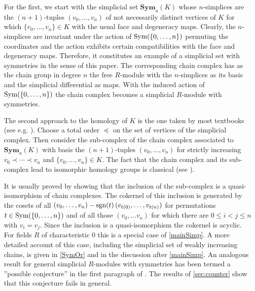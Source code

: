 \documentclass[12pt]{amsart}
\theoremstyle{plain}
\numberwithin{lemma}{\DefaultNumberTheoremWithin}
\numberwithin{claim}{\DefaultNumberTheoremWithin}
\numberwithin{theorem}{\DefaultNumberTheoremWithin}
\numberwithin{corollary}{\DefaultNumberTheoremWithin}
\numberwithin{proposition}{\DefaultNumberTheoremWithin}
\numberwithin{conjecture}{\DefaultNumberTheoremWithin}
\theoremstyle{definition}
\theoremstyle{definition}
\numberwithin{question}{\DefaultNumberTheoremWithin}
\theoremstyle{definition}
\numberwithin{problem}{\DefaultNumberTheoremWithin}
\theoremstyle{remark}
\numberwithin{remark}{\DefaultNumberTheoremWithin}
\theoremstyle{remark}
\numberwithin{example}{\DefaultNumberTheoremWithin}
\def\sgn{\textnormal{sgn}}
\begin{document}
For the first, we start with the simplicial set $\mathbf{Sym}_a(K)$ whose $n$-simplices are the
$(n+1)$-tuples $(v_0,\dots,v_n)$ of not necessarily distinct vertices of $K$ for which $\{v_0,\ldots, v_n\} \in K$ with the usual face and degeneracy maps. Clearly, the $n$-simplices are invariant under the
action of $\textnormal{Sym}(\{0,\ldots,n\})$ permuting the coordinates and the action exhibits certain compatibilities with the face and degeneracy maps. Therefore, it 
constitutes an example of a simplicial set with symmetries in the sense of this paper. The corresponding chain complex has
as the chain group in degree $n$ the free $R$-module with the $n$-simplices as its basis and the simplicial differential 
as maps. With the induced action of $\textnormal{Sym}(\{0,\ldots,n\})$ the chain complex becomes a simplicial
$R$-module with symmetries.  

The second approach to the homology of $K$ is the one taken
by most textbooks (see e.g. \cite{hatcher}). 
Choose a total order $\preceq$ on the set of vertices of the simplicial complex. 
Then consider the sub-complex of the chain complex 
associated to $\mathbf{Sym}_a(K)$ with basis the $(n+1)$-tuples $(v_0,\ldots, v_n)$ for strictly increasing $v_0 \prec \cdots \prec v_n$ and 
$\{v_0,\ldots, v_n \} \in K$. 
The fact that the chain complex and its sub-complex 
lead to isomorphic
homology groups is classical (see \cite{EilenbergSteenrodBook}). 

It is usually proved by showing that the inclusion of the sub-complex is a quasi-isomorphism of chain complexes. The cokernel of this inclusion is generated by the cosets of all $(v_0,\ldots, v_n)-\sgn(t)\,(v_{t(0)},\ldots, v_{t(n)})$ for permutations $t \in \textnormal{Sym}(\{0,\dots, n\})$ and of all those $(v_0,\ldots v_n)$ for
which there are $0 \leq i < j \leq n$ with $v_i=v_j$.
Since the inclusion is a quasi-isomorphism the cokernel is acyclic. For fields $R$ of characteristic $0$ this is a  special case
of \ref{mainSimp}. 
 A more detailed account of this case, including the simplicial set of weakly increasing chains, is given in \ref{SymOr} and in the discussion after \ref{mainSimp}. 
An analogous result for general 
 simplicial $R$-modules with symmetries has been termed a ''possible conjecture'' in the first paragraph of \cite[p. 59]{GodementBook}. The results of \ref{sec:counter} show that this conjecture fails in general.
\end{document}
